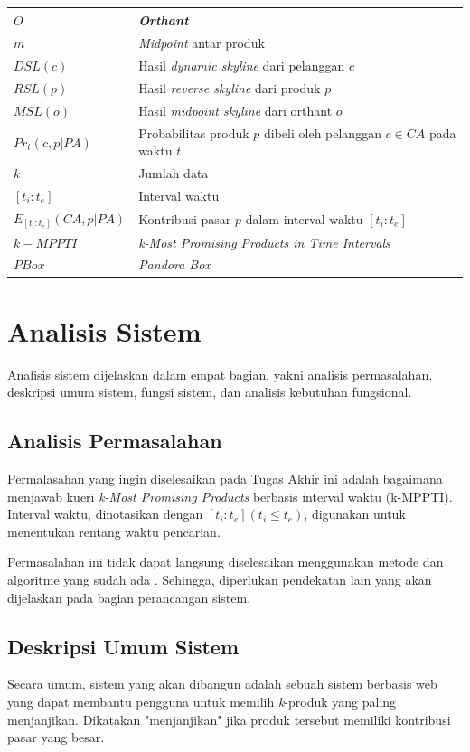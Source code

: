 \begin{longtable}{| p{3cm} | p{6cm} |}
	$O$ & \textit{Orthant}\\ \hline
	$m$ & \textit{Midpoint} antar produk\\ \hline
	$DSL(c)$ & Hasil \textit{dynamic skyline} dari pelanggan $c$\\ \hline
	$RSL(p)$ & Hasil \textit{reverse skyline} dari produk $p$\\ \hline
	$MSL(o)$ & Hasil \textit{midpoint skyline} dari orthant $o$\\ \hline
	$Pr_t(c, p|PA)$ & Probabilitas produk $p$ dibeli oleh pelanggan $c \in CA$ pada waktu $t$ \\ \hline
	$k$ & Jumlah data \\ \hline
	$[t_i:t_e]$ & Interval waktu \\ \hline
	$E_{[t_i:t_e]}(CA, p|PA)$ & Kontribusi pasar $p$ dalam interval waktu $[t_i:t_e]$\\ \hline
	$k-MPPTI$ & \textit{k-Most Promising Products in Time Intervals} \\ \hline
	$PBox$ & \textit{Pandora Box} \\ \hline
\end{longtable}

\pagebreak
\section{Analisis Sistem}
\tab Analisis sistem dijelaskan dalam empat bagian, yakni analisis permasalahan, deskripsi umum sistem, fungsi sistem, dan analisis kebutuhan fungsional.

\subsection{Analisis Permasalahan}
\tab Permalasahan yang ingin diselesaikan pada Tugas Akhir ini adalah bagaimana menjawab kueri \textit{k-Most Promising Products} berbasis interval waktu (k-MPPTI). Interval waktu, dinotasikan dengan $[t_i:t_e ](t_i \leq t_e)$, digunakan untuk menentukan rentang waktu pencarian.

Permasalahan ini tidak dapat langsung diselesaikan menggunakan metode dan algoritme yang sudah ada \cite{kmpp}. Sehingga, diperlukan pendekatan lain yang akan dijelaskan pada bagian perancangan sistem.

\subsection{Deskripsi Umum Sistem}
\tab Secara umum, sistem yang akan dibangun adalah sebuah sistem berbasis web yang dapat membantu pengguna untuk memilih \textit{k}-produk yang paling menjanjikan. Dikatakan "menjanjikan" jika produk tersebut memiliki kontribusi pasar yang besar.

